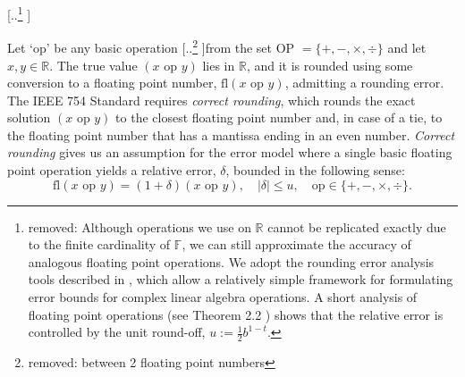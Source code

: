 \documentclass[review,onefignum,onetabnum]{siamart190516}
\newcommand{\R}{\mathbb{R}}
\newcommand{\F}{\mathbb{F}}
\newcommand{\dd}{\delta}
\newcommand{\fl}{\mathrm{fl}}
\providecommand{\DIFadd}[1]{{\protect\color{blue} \sf #1}} %
\providecommand{\DIFdel}[1]{{\protect\color{red} [..\footnote{removed: #1} ]}} %
\providecommand{\DIFaddbegin}{} %
\providecommand{\DIFaddend}{} %
\providecommand{\DIFdelbegin}{} %
\providecommand{\DIFdelend}{} %
\begin{document}
\DIFdelbegin \DIFdel{Although operations we use on $\R$ cannot be replicated exactly due to the finite cardinality of $\F$, we can still approximate the accuracy of analogous floating point operations.
We adopt the rounding error analysis tools described in \cite{Higham2002}, which allow a relatively simple framework for formulating error bounds for complex linear algebra operations. 
A short analysis of floating point operations (see Theorem 2.2 \cite{Higham2002}) shows that the relative error is 
controlled by the unit round-off, $u:=\frac{1}{2}b^{1-t}$. }%

\DIFdelend Let `op' be any basic operation \DIFdelbegin \DIFdel{between 2 floating point numbers }\DIFdelend from the set OP $=\{+, -, \times, \div\}$ \DIFaddbegin \DIFadd{and let $x,y\in \R$}\DIFaddend .
The true value $(x\text{ op }y)$ lies in $\R$, and it is rounded using some conversion to a floating point number, $\fl(x\text{ op }y)$, admitting a rounding error. 
The IEEE 754 Standard requires \emph{correct rounding}, which rounds the exact solution $(x\text{ op }y)$ to the closest floating point number and, in case of a tie, to the floating point number that has a mantissa ending in an even number.
\emph{Correct rounding} gives us an assumption for the error model where a single basic floating point operation yields a relative error, $\dd$, bounded in the following sense:
\begin{equation}
\fl(x\text{ op }y) = (1 + \dd)(x\text{ op }y),\quad |\dd|\leq u, \quad \text{op}\in\{+, -, \times, \div\}. \label{eqn:singlefpe}
\end{equation}
\DIFdelbegin %
\end{document}
